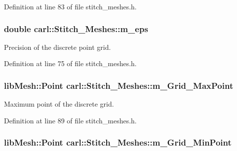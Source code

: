 Definition at line 83 of file stitch\+\_\+meshes.\+h.

\hypertarget{classcarl_1_1_stitch___meshes_a1cbb52478197125ed915538dc9c717c2}{}
\subsubsection[{m\+\_\+eps}]{\setlength{\rightskip}{0pt plus 5cm}double carl\+::\+Stitch\+\_\+\+Meshes\+::m\+\_\+eps\hspace{0.3cm}{\ttfamily [protected]}}\label{classcarl_1_1_stitch___meshes_a1cbb52478197125ed915538dc9c717c2}


Precision of the discrete point grid. 



Definition at line 75 of file stitch\+\_\+meshes.\+h.

\hypertarget{classcarl_1_1_stitch___meshes_a06ac179f70188b5fed34f32e88a37787}{}
\subsubsection[{m\+\_\+\+Grid\+\_\+\+Max\+Point}]{\setlength{\rightskip}{0pt plus 5cm}lib\+Mesh\+::\+Point carl\+::\+Stitch\+\_\+\+Meshes\+::m\+\_\+\+Grid\+\_\+\+Max\+Point\hspace{0.3cm}{\ttfamily [protected]}}\label{classcarl_1_1_stitch___meshes_a06ac179f70188b5fed34f32e88a37787}


Maximum point of the discrete grid. 



Definition at line 89 of file stitch\+\_\+meshes.\+h.

\hypertarget{classcarl_1_1_stitch___meshes_a7bf918ef98a9bc853afe749c44d35f35}{}
\subsubsection[{m\+\_\+\+Grid\+\_\+\+Min\+Point}]{\setlength{\rightskip}{0pt plus 5cm}lib\+Mesh\+::\+Point carl\+::\+Stitch\+\_\+\+Meshes\+::m\+\_\+\+Grid\+\_\+\+Min\+Point\hspace{0.3cm}{\ttfamily [protected]}}\label{classcarl_1_1_stitch___meshes_a7bf918ef98a9bc853afe749c44d35f35}


